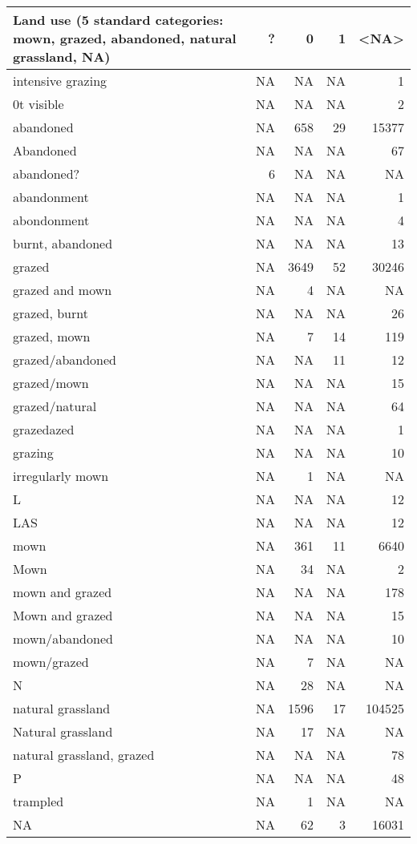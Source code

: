 \documentclass[table]{article}
\begin{document}
\begin{tabular}{>{\raggedright\arraybackslash}p{8cm}|r|r|r|r}
\hline
Land use (5 standard categories: mown, grazed, abandoned, natural grassland, NA) & ? & 0 & 1 & <NA>\\
\hline
0 intensive grazing & NA & NA & NA & 1\\
\hline
0t visible & NA & NA & NA & 2\\
\hline
abandoned & NA & 658 & 29 & 15377\\
\hline
Abandoned & NA & NA & NA & 67\\
\hline
abandoned? & 6 & NA & NA & NA\\
\hline
abandonment & NA & NA & NA & 1\\
\hline
abondonment & NA & NA & NA & 4\\
\hline
burnt, abandoned & NA & NA & NA & 13\\
\hline
grazed & NA & 3649 & 52 & 30246\\
\hline
grazed and mown & NA & 4 & NA & NA\\
\hline
grazed, burnt & NA & NA & NA & 26\\
\hline
grazed, mown & NA & 7 & 14 & 119\\
\hline
grazed/abandoned & NA & NA & 11 & 12\\
\hline
grazed/mown & NA & NA & NA & 15\\
\hline
grazed/natural & NA & NA & NA & 64\\
\hline
grazedazed & NA & NA & NA & 1\\
\hline
grazing & NA & NA & NA & 10\\
\hline
irregularly mown & NA & 1 & NA & NA\\
\hline
L & NA & NA & NA & 12\\
\hline
LAS & NA & NA & NA & 12\\
\hline
mown & NA & 361 & 11 & 6640\\
\hline
Mown & NA & 34 & NA & 2\\
\hline
mown and grazed & NA & NA & NA & 178\\
\hline
Mown and grazed & NA & NA & NA & 15\\
\hline
mown/abandoned & NA & NA & NA & 10\\
\hline
mown/grazed & NA & 7 & NA & NA\\
\hline
N & NA & 28 & NA & NA\\
\hline
natural grassland & NA & 1596 & 17 & 104525\\
\hline
Natural grassland & NA & 17 & NA & NA\\
\hline
natural grassland, grazed & NA & NA & NA & 78\\
\hline
P & NA & NA & NA & 48\\
\hline
trampled & NA & 1 & NA & NA\\
\hline
NA & NA & 62 & 3 & 16031\\
\hline
\end{tabular}
\end{document}
